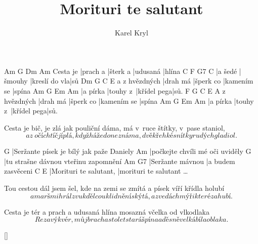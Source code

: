 \documentclass{song}
\title{Morituri te salutant}
\author{Karel Kryl}
\begin{document}
\strophe
         Am       G        Dm       Am
Cesta je |prach a |šterk a |udusaná |hlína
C       F       G7            C
|a šedé |šmouhy |kreslí do vla|sů
              Dm       G         C           E
a z hvězdných |drah má |šperk co |kamením se |spína
Am       G        Em          Am
|a pírka |touhy z~|křídel pega|sů.
              F        G         C           E
A z hvězdných |drah má |šperk co |kamením se |spína
Am       G        Em          Am
|a pírka |touhy z~|křídel pega|sů.
\endstrophe

\strophe*
Cesta je bič, je zlá jak pouliční dáma,
má v~ruce štítky, v~pase staniol,
\[ a z~očí chtíč jí plá, když háže do neznáma,
dvě křehké snítky rudých gladiol. \]
\endstrophe

G
|Seržante písek je bílý jak paže Daniely
Am
|počkejte chvíli mé oči uviděly
G
|tu strašne dávnou vteřinu zapomnění
Am               G7
|Seržante mávnou |a budem zasvěceni
C                      E
|Morituri te salutant, |morituri te salutant \ldots
\endstrophe

\strophe*
Tou cestou dál jsem šel, kde na zemi se zmítá
a písek víří křídla holubí
\[ a marš mi hrál zvuk děl co uklidnění skýtá,
a zvedá chmýři které zahubí. \]
\endstrophe

\strophe*
Cesta je tér a prach a udusaná hlína
mosazná včelka od vlkodlaka
\[ Rezavý kvér, můj brach a sto let stará špína
a děsně velká bíla oblaka. \]
\endstrophe

\ref{}
\end{document}
